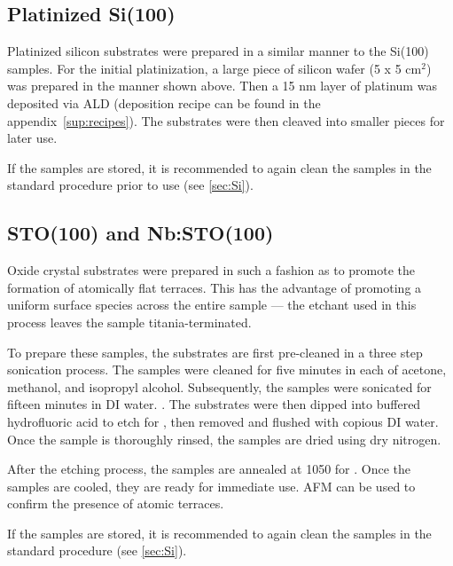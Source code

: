 
\subsection{Platinized Si(100)}

Platinized silicon substrates were prepared in a similar manner to the Si(100) samples. For the initial platinization, a large piece of silicon wafer (5 x 5 cm$^{2}$) was prepared in the manner shown above. Then a 15 nm layer of platinum was deposited via ALD (deposition recipe can be found in the appendix~\vref{sup:recipes}). The substrates were then cleaved into smaller pieces for later use. 

If the samples are stored, it is recommended to again clean the samples in the standard procedure prior to use (see \vref{sec:Si}).


\subsection{STO(100) and Nb:STO(100)}

Oxide crystal substrates were prepared in such a fashion as to promote the formation of atomically flat terraces. This has the advantage of promoting a uniform surface species across the entire sample --- the etchant used in this process leaves the sample titania-terminated. 

To prepare these samples, the substrates are first pre-cleaned in a three step sonication process. The samples were cleaned for five minutes in each of acetone, methanol, and isopropyl alcohol. Subsequently, the samples were sonicated for fifteen minutes in DI water. . The substrates were then dipped into buffered hydrofluoric acid to etch for , then removed and flushed with copious DI water.  Once the sample is thoroughly rinsed, the samples are dried using dry nitrogen. 

After the etching process, the samples are annealed at 1050\degC{} for . Once the samples are cooled, they are ready for immediate use. AFM can be used to confirm the presence of atomic terraces. 

If the samples are stored, it is recommended to again clean the samples in the standard procedure (see \vref{sec:Si}).


